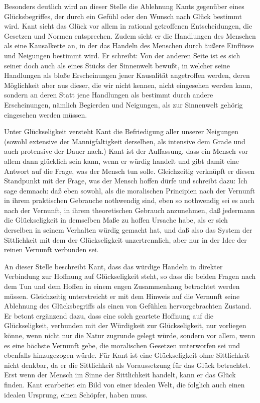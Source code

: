 Besonders deutlich wird an dieser Stelle die Ablehnung Kants gegenüber eines Glücksbegriffes, der durch ein Gefühl oder den Wunsch nach Glück bestimmt wird. 
Kant sieht das Glück vor allem in rational getroffenen Entscheidungen, die Gesetzen und Normen entsprechen. 
Zudem sieht er die Handlungen des Menschen als eine Kausalkette an, in der das Handeln des Menschen durch äußere Einflüsse und Neigungen bestimmt wird. 
Er schreibt: \glqq Von der anderen Seite ist es sich seiner doch auch als eines Stücks der Sinnenwelt bewußt, in welcher seine Handlungen als bloße Erscheinungen jener Kausalität angetroffen werden, deren Möglichkeit aber aus dieser, die wir nicht kennen, nicht eingesehen werden kann, sondern an deren Statt jene Handlungen als bestimmt durch andere Erscheinungen, nämlich Begierden und Neigungen, als zur Sinnenwelt gehörig eingesehen werden müssen.\grqq{}\cite{IK65, S.79f}

Unter Glückseligkeit versteht Kant \glqq die Befriedigung aller unserer Neigungen (sowohl extensive der Mannigfaltigkeit derselben, als intensive dem Grade und auch protensive der Dauer nach.)\grqq{}\cite{IK73, S.523} 
Kant ist der Auffassung, dass ein Mensch vor allem dann glücklich sein kann, wenn er würdig handelt und gibt damit eine Antwort auf die Frage, was der Mensch tun solle. 
Gleichzeitig verknüpft er diesen Standpunkt mit der Frage, was der Mensch hoffen dürfe und schreibt dazu: \glqq Ich sage demnach: daß eben sowohl, als die moralischen Principien nach der Vernunft in ihrem praktischen Gebrauche nothwendig sind, eben so nothwendig sei es auch nach der Vernunft, in ihrem theoretischen Gebrauch anzunehmen, daß jedermann die Glückseligkeit in demselben Maße zu hoffen Ursache habe, als er sich derselben in seinem Verhalten würdig gemacht hat, und daß also das System der Sittlichkeit mit dem der Glückseligkeit unzertrennlich, aber nur in der Idee der reinen Vernunft verbunden sei.\grqq{}\cite{IK73, S.525}

An dieser Stelle beschreibt Kant, dass das würdige Handeln in direkter Verbindung zur Hoffnung auf Glückseligkeit steht, so dass die beiden Fragen nach dem Tun und dem Hoffen in einem engen Zusammenhang betrachtet werden müssen. 
Gleichzeitig unterstreicht er mit dem Hinweis auf die Vernunft seine Ablehnung des Glücksbegriffs als einen von Gefühlen hervorgebrachten Zustand. 
Er betont ergänzend dazu, dass eine solch geartete Hoffnung auf die Glückseligkeit, verbunden mit der Würdigkeit zur Glückseligkeit, nur vorliegen könne, wenn nicht nur die Natur zugrunde gelegt würde, sondern vor allem, wenn es eine höchste Vernunft gebe, die moralischen Gesetzen unterworfen sei und ebenfalls hinzugezogen würde.
Für Kant ist eine Glückseligkeit ohne Sittlichkeit nicht denkbar, da er die Sittlichkeit als Voraussetzung für das Glück betrachtet. 
Erst wenn der Mensch im Sinne der Sittlichkeit handelt, kann er das Glück finden. 
Kant erarbeitet ein Bild von einer idealen Welt, die folglich auch einen idealen Ursprung, einen Schöpfer, haben muss\cite{IK73, S.526}.


